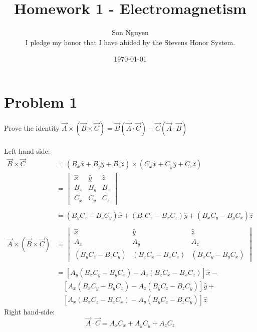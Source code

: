 \documentclass[12pt]{article}
\title{Homework 1 - Electromagnetism}
\author{Son Nguyen \\
I pledge my honor that I have abided by the Stevens Honor System.}
\date{\today}
\begin{document}
\maketitle

\section*{Problem 1}
Prove the identity \(\vec{A} \times (\vec{B} \times \vec{C}) = \vec{B} (\vec{A} \cdot \vec{C}) - \vec{C}  (\vec{A} \cdot \vec{B})\) \\ \\
Left hand-side:
\begin{align*}
	\vec{B} \times \vec{C}                  & = (B_x \hat{x} + B_y \hat{y} + B_z \hat{z}) \times (C_x \hat{x} + C_y \hat{y} + C_z \hat{z}) \\
	                                        & = \begin{vmatrix}
		                                            \hat{x} & \hat{y} & \hat{z} \\
		                                            B_x     & B_y     & B_z     \\
		                                            C_x     & C_y     & C_z
	                                            \end{vmatrix}                                                                \\ \\
	                                        & = (B_y C_z - B_z C_y) \hat{x} + (B_z C_x - B_x C_z ) \hat{y} + (B_x C_y - B_y C_x) \hat{z}    \\ \\
	\vec{A} \times (\vec{B} \times \vec{C}) & =
	\begin{vmatrix}
		\hat{x}             & \hat{y}             & \hat{z}             \\
		A_x                 & A_y                 & A_z                 \\
		(B_y C_z - B_z C_y) & (B_z C_x - B_x C_z) & (B_x C_y - B_y C_x)
	\end{vmatrix}                                                                        \\ \\
	                                        & = [A_y(B_x C_y - B_y C_x) - A_z(B_z C_x - B_x C_z)] \hat{x} -                                \\
	                                        & \quad [A_x(B_x C_y - B_y C_x) - A_z(B_y C_z - B_z C_y)] \hat{y} +                            \\
	                                        & \quad [A_x(B_x C_z - B_z C_x) - A_y(B_y C_z - B_z C_y)] \hat{z}
\end{align*}
Right hand-side:
\[\vec{A} \cdot \vec{C} = A_x C_x + A_y C_y + A_z C_z\]
\end{document}
